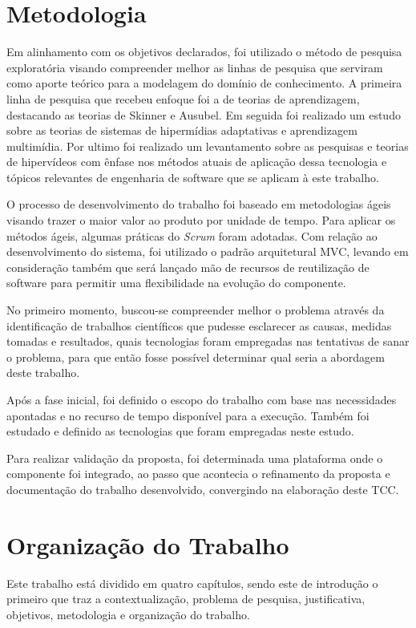 \section{Metodologia}

Em alinhamento com os objetivos declarados, foi utilizado o método de pesquisa exploratória visando compreender melhor as linhas de pesquisa que serviram como aporte teórico para a modelagem do domínio de conhecimento. A primeira linha de pesquisa que recebeu enfoque foi a de teorias de aprendizagem, destacando as teorias de Skinner e Ausubel. Em seguida foi realizado um estudo sobre as teorias de sistemas de hipermídias adaptativas e aprendizagem multimídia. Por ultimo foi realizado um levantamento sobre as pesquisas e teorias de hipervídeos com ênfase nos métodos atuais de aplicação dessa tecnologia e tópicos relevantes de engenharia de software que se aplicam à este trabalho.

O processo de desenvolvimento do trabalho foi baseado em metodologias ágeis visando trazer o maior valor ao produto por unidade de tempo. Para aplicar os métodos ágeis, algumas práticas do \textit{Scrum} foram adotadas. Com relação ao desenvolvimento do sistema, foi utilizado o padrão arquitetural MVC, levando em consideração também que será lançado mão de recursos de reutilização de software para permitir uma flexibilidade na evolução do componente.

No primeiro momento, buscou-se compreender melhor o problema através da identificação de trabalhos científicos que pudesse esclarecer as causas, medidas tomadas e resultados, quais tecnologias foram empregadas nas tentativas de sanar o problema, para que então fosse possível determinar qual seria a abordagem deste trabalho.

Após a fase inicial, foi definido o escopo do trabalho com base nas necessidades apontadas e no recurso de tempo disponível para a execução. Também foi estudado e definido as tecnologias que foram empregadas neste estudo.

Para realizar validação da proposta, foi determinada uma plataforma onde o componente foi integrado, ao passo que acontecia o refinamento da proposta e documentação do trabalho desenvolvido, convergindo na elaboração deste TCC.

\section{Organização do Trabalho}

Este trabalho está dividido em quatro capítulos, sendo este de introdução o primeiro que traz a contextualização, problema de pesquisa, justificativa, objetivos, metodologia e organização do trabalho.

